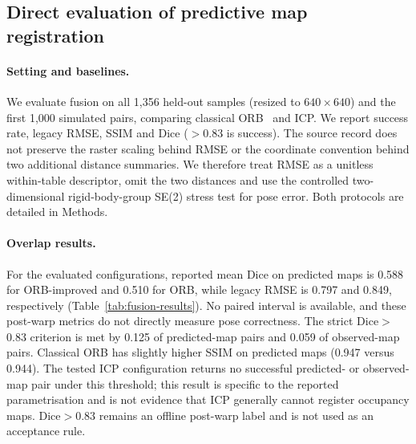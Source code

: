 \documentclass[11pt]{article}
\begin{document}
\subsection{Direct evaluation of predictive map registration} \label{sec:map-fusion-experiments}

\paragraph{Setting and baselines.}
We evaluate fusion on all 1{,}356 held-out samples (resized to $640{\times}640$) and the first 1{,}000 simulated pairs, comparing classical ORB~\citep{rublee2011orb} and ICP. We report success rate, legacy RMSE, SSIM and Dice ($>0.83$ is success). The source record does not preserve the raster scaling behind RMSE or the coordinate convention behind two additional distance summaries. We therefore treat RMSE as a unitless within-table descriptor, omit the two distances and use the controlled two-dimensional rigid-body-group SE(2) stress test for pose error. Both protocols are detailed in Methods.

\paragraph{Overlap results.} For the evaluated configurations, reported mean Dice on predicted maps is 0.588 for ORB-improved and 0.510 for ORB, while legacy RMSE is 0.797 and 0.849, respectively (Table~\ref{tab:fusion-results}). No paired interval is available, and these post-warp metrics do not directly measure pose correctness. The strict Dice$>$0.83 criterion is met by 0.125 of predicted-map pairs and 0.059 of observed-map pairs. Classical ORB has slightly higher SSIM on predicted maps (0.947 versus 0.944). The tested ICP configuration returns no successful predicted- or observed-map pair under this threshold; this result is specific to the reported parametrisation and is not evidence that ICP generally cannot register occupancy maps. Dice$>$0.83 remains an offline post-warp label and is not used as an acceptance rule.
\end{document}

